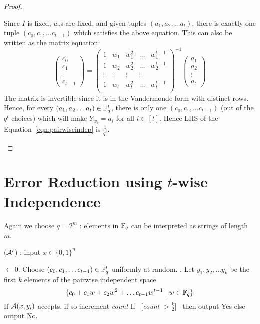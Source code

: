 \begin{proof}
\begin{description}
Since $I$ is fixed, $w_i$s are fixed, and given tuples $(a_1, a_2, \ldots a_t)$, there is exactly one tuple $(c_0, c_1, \ldots c_{t-1})$ which satisfies the above equation.
This can also be written as the matrix equation:
\[
\begin{pmatrix}
c_0 \\
c_1 \\
\vdots \\
c_{t-1}
\end{pmatrix}
=
\begin{pmatrix}
1 & w_1 & w_1^2 & \ldots & w_1^{t-1} \\
1 & w_2 & w_2^2 & \ldots & w_2^{t-1} \\
\vdots & \vdots & \vdots & \vdots \\
1 & w_t & w_t^2 & \ldots & w_t^{t-1} \\
\end{pmatrix}^{-1}
\begin{pmatrix}
a_1 \\
a_2 \\
\vdots \\
a_t
\end{pmatrix}
\]
The matrix is invertible since it is in the Vandermonde form with distinct rows. Hence, for every $(a_1, a_2 \ldots a_t) \in {\mathbb{F}}_q^t $, there is only one $(c_0, c_1, \ldots c_{t-1})$ (out of the $q^t$ choices) which will make $Y_{w_i} = a_i$ for all $i \in [t]$. Hence LHS of the Equation~\ref{eqn:pairwiseindep} is $\frac{1}{q^t}$.
\end{description}
\end{proof}

\section{Error Reduction using $t$-wise Independence}
Again we choose $q = 2^m$ : elements in ${\mathbb{F}}_q$ can be interpreted as strings of length $m$.

\begin{algorithm}
\label{alg:twise-indep-amplification}
\caption{(${\cal{A}'}$) : input $x \in \{0,1\}^n$} 
\begin{algorithmic}[1]
 $\gets 0$. 
\State Choose $(c_0, c_1, \ldots c_{t-1}) \in {\mathbb{F}}_q^t$ uniformly at random. . 
\State Let $y_1, y_2, \ldots y_k$ be the first $k$ elements of the pairwise independent space 
\vspace{-3mm}
$$\{  c_0+c_1w+c_2w^2+ \ldots c_{t-1}w^{t-1} \mid w \in {\mathbb{F}}_q \}$$
\vspace{-10mm}
	\State If ${\cal{A}}(x,y_i)$ accepts, if so increment {\em count}
\EndFor
\State If ~[{\em count} $> \frac{k}{2}$]~ then output {\sc Yes} else output {\sc No}.
\end{algorithmic}
\end{algorithm}


